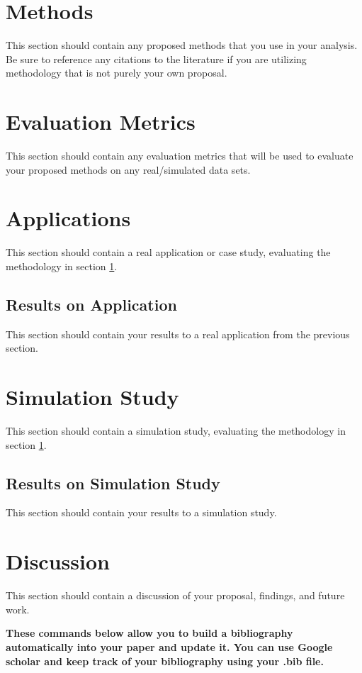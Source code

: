 \documentclass[12,runningheads,a4paper]{llncs}
\newcommand{\1}[1]{\mathbb{I}\!\left[#1\right]} %
\begin{document}
\section{Methods}
\label{sec:methods}
This section should contain any proposed methods that you use in your analysis. Be sure to reference any citations to the literature if you are utilizing methodology that is not purely your own proposal. 

\section{Evaluation Metrics}
\label{sec:evaluations}
This section should contain any evaluation metrics that will be used to evaluate your proposed methods on any real/simulated data sets. 

\section{Applications}
\label{sec:app}
This section should contain a real application or case study, evaluating the methodology in section \ref{sec:methods}.

\subsection{Results on Application}
\label{sec:results-app}
This section should contain your results to a real application from the previous section. 

\section{Simulation Study}
\label{sec:sim}
This section should contain a simulation study, evaluating the methodology in section \ref{sec:methods}.

\subsection{Results on Simulation Study}
\label{sec:sim-results}
\label{sec:results-app}
This section should contain your results to a simulation study. 

\section{Discussion}
\label{sec:discussion}
This section should contain a discussion of your proposal, findings, and future work. 


\textbf{These commands below allow you to build a bibliography automatically into your paper and update it. You can use Google scholar and keep track of your bibliography using your .bib file.}
\end{document}
